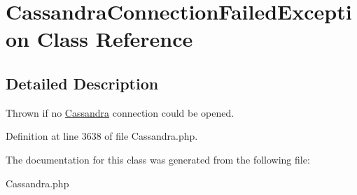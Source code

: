 \hypertarget{classCassandraConnectionFailedException}{
\section{CassandraConnectionFailedException Class Reference}
\label{classCassandraConnectionFailedException}
}


\subsection{Detailed Description}
Thrown if no \hyperlink{classCassandra}{Cassandra} connection could be opened. 

Definition at line 3638 of file Cassandra.php.



The documentation for this class was generated from the following file:\begin{DoxyCompactItemize}
\item 
Cassandra.php\end{DoxyCompactItemize}
